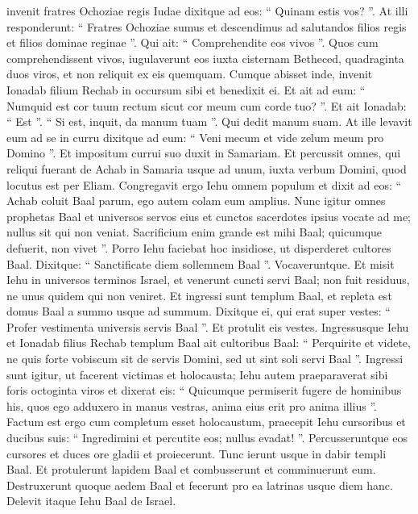 \begin{biblechapter}
\begin{biblechapter}
\begin{biblechapter}
\begin{biblechapter}
\begin{biblechapter}
\begin{biblechapter}
\begin{biblechapter}
\begin{biblechapter}
\begin{biblechapter}
\begin{biblechapter}
\verse invenit fratres Ochoziae regis Iudae dixitque ad eos: “ Quinam estis vos? ”. At illi responderunt: “ Fratres Ochoziae sumus et descendimus ad salutandos filios regis et filios dominae reginae ”. 
\verse Qui ait: “ Comprehendite eos vivos ”. Quos cum comprehendissent vivos, iugulaverunt eos iuxta cisternam Betheced, quadraginta duos viros, et non reliquit ex eis quemquam.
 \verse Cumque abisset inde, invenit Ionadab filium Rechab in occursum sibi et benedixit ei. Et ait ad eum: “ Numquid est cor tuum rectum sicut cor meum cum corde tuo? ”. Et ait Ionadab: “ Est ”. “ Si est, inquit, da manum tuam ”. Qui dedit manum suam. At ille levavit eum ad se in curru 
\verse dixitque ad eum: “ Veni mecum et vide zelum meum pro Domino ”. Et impositum currui suo 
\verse duxit in Samariam. Et percussit omnes, qui reliqui fuerant de Achab in Samaria usque ad unum, iuxta verbum Domini, quod locutus est per Eliam.
 \verse Congregavit ergo Iehu omnem populum et dixit ad eos: “ Achab coluit Baal parum, ego autem colam eum amplius. 
\verse Nunc igitur omnes prophetas Baal et universos servos eius et cunctos sacerdotes ipsius vocate ad me; nullus sit qui non veniat. Sacrificium enim grande est mihi Baal; quicumque defuerit, non vivet ”. Porro Iehu faciebat hoc insidiose, ut disperderet cultores Baal. 
\verse Dixitque: “ Sanctificate diem sollemnem Baal ”. Vocaveruntque. 
\verse Et misit Iehu in universos terminos Israel, et venerunt cuncti servi Baal; non fuit residuus, ne unus quidem qui non veniret. Et ingressi sunt templum Baal, et repleta est domus Baal a summo usque ad summum. 
\verse Dixitque ei, qui erat super vestes: “ Profer vestimenta universis servis Baal ”. Et protulit eis vestes. 
\verse Ingressusque Iehu et Ionadab filius Rechab templum Baal ait cultoribus Baal: “ Perquirite et videte, ne quis forte vobiscum sit de servis Domini, sed ut sint soli servi Baal ”.
 \verse Ingressi sunt igitur, ut facerent victimas et holocausta; Iehu autem praeparaverat sibi foris octoginta viros et dixerat eis: “ Quicumque permiserit fugere de hominibus his, quos ego adduxero in manus vestras, anima eius erit pro anima illius ”. 
\verse Factum est ergo cum completum esset holocaustum, praecepit Iehu cursoribus et ducibus suis: “ Ingredimini et percutite eos; nullus evadat! ”. Percusseruntque eos cursores et duces ore gladii et proiecerunt. Tunc ierunt usque in dabir templi Baal. 
\verse Et protulerunt lapidem Baal et combusserunt 
\verse et comminuerunt eum. Destruxerunt quoque aedem Baal et fecerunt pro ea latrinas usque diem hanc.
 \verse Delevit itaque Iehu Baal de Israel. 

\end{biblechapter}
\end{biblechapter}
\end{biblechapter}
\end{biblechapter}
\end{biblechapter}
\end{biblechapter}
\end{biblechapter}
\end{biblechapter}
\end{biblechapter}
\end{biblechapter}
